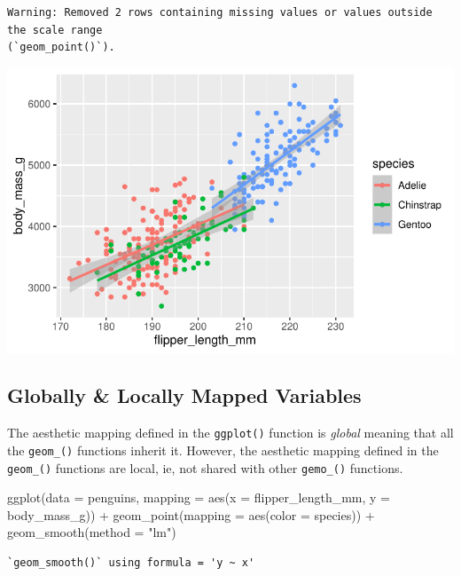 \documentclass[
  letterpaper,
  DIV=11,
  numbers=noendperiod]{scrreprt}
\newenvironment{Shaded}{\begin{snugshade}}{\end{snugshade}}
\newcommand{\AttributeTok}[1]{\textcolor[rgb]{0.40,0.45,0.13}{#1}}
\newcommand{\FunctionTok}[1]{\textcolor[rgb]{0.28,0.35,0.67}{#1}}
\newcommand{\NormalTok}[1]{\textcolor[rgb]{0.00,0.23,0.31}{#1}}
\newcommand{\SpecialCharTok}[1]{\textcolor[rgb]{0.37,0.37,0.37}{#1}}
\newcommand{\StringTok}[1]{\textcolor[rgb]{0.13,0.47,0.30}{#1}}
\begin{document}
\begin{verbatim}
Warning: Removed 2 rows containing missing values or values outside the scale range
(`geom_point()`).
\end{verbatim}

\includegraphics{src/r-for-data-science/01-data-viz_files/figure-pdf/unnamed-chunk-9-1.pdf}

\subsection{Globally \& Locally Mapped
Variables}\label{globally-locally-mapped-variables}

The aesthetic mapping defined in the \texttt{ggplot()} function is
\emph{global} meaning that all the \texttt{geom\_()} functions inherit
it. However, the aesthetic mapping defined in the \texttt{geom\_()}
functions are local, ie, not shared with other \texttt{gemo\_()}
functions.

\begin{Shaded}
\begin{Highlighting}[]
\FunctionTok{ggplot}\NormalTok{(}\AttributeTok{data =}\NormalTok{ penguins,}
       \AttributeTok{mapping =} \FunctionTok{aes}\NormalTok{(}\AttributeTok{x =}\NormalTok{ flipper\_length\_mm, }\AttributeTok{y =}\NormalTok{ body\_mass\_g)) }\SpecialCharTok{+}
  \FunctionTok{geom\_point}\NormalTok{(}\AttributeTok{mapping =} \FunctionTok{aes}\NormalTok{(}\AttributeTok{color =}\NormalTok{ species)) }\SpecialCharTok{+}
  \FunctionTok{geom\_smooth}\NormalTok{(}\AttributeTok{method =} \StringTok{"lm"}\NormalTok{)}
\end{Highlighting}
\end{Shaded}

\begin{verbatim}
`geom_smooth()` using formula = 'y ~ x'
\end{verbatim}
\end{document}
